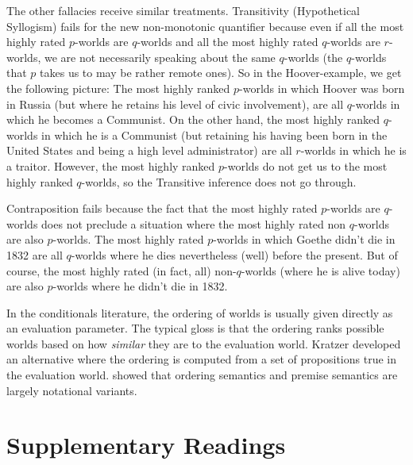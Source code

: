 The other fallacies receive similar treatments. Transitivity (Hypothetical Syllogism) fails for the new non-monotonic quantifier because even if all the most highly rated $p$-worlds are $q$-worlds and all the most highly rated $q$-worlds are $r$-worlds, we are not necessarily speaking about the same $q$-worlds (the $q$-worlds that $p$ takes us to may be rather remote ones). So in the Hoover-example, we get the following picture: The most highly ranked $p$-worlds in which Hoover was born in Russia (but where he retains his level of civic involvement), are all $q$-worlds in which he becomes a Communist. On the other hand, the most highly ranked $q$-worlds in which he is a Communist (but retaining his having been born in the United States and being a high level administrator) are all $r$-worlds in which he is a traitor. However, the most highly ranked $p$-worlds do not get us to the most highly ranked $q$-worlds, so the Transitive inference does not go through.

Contraposition fails because the fact that the most highly rated $p$-worlds are $q$-worlds does not preclude a situation where the most highly rated non $q$-worlds are also $p$-worlds. The most highly rated $p$-worlds in which Goethe didn't die in 1832 are all $q$-worlds where he dies nevertheless (well) before the present. But of course, the most highly rated (in fact, all) non-$q$-worlds (where he is alive today) are also $p$-worlds where he didn't die in 1832.

In the conditionals literature, the ordering of worlds is usually given directly as an evaluation parameter. The typical gloss is that the ordering ranks possible worlds based on how \emph{similar} they are to the evaluation world. Kratzer developed an alternative where the ordering is computed from a set of propositions true in the evaluation world. \citet{lewis:1981:ordering} showed that ordering semantics and premise semantics are largely notational variants.

\section*{Supplementary Readings} \label{sec:suppl-read-ordering}

 {}

